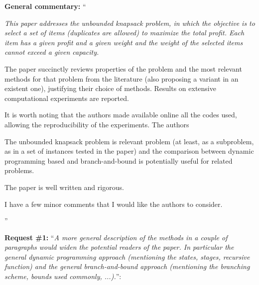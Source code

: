 \documentclass{elsarticle}
\begin{document}
\textbf{General commentary:} ``{\itshape
This paper addresses the unbounded knapsack problem, in which the objective is to select a set of items (duplicates are allowed) to maximize the total profit. Each item has a given profit and a given weight and the weight of the selected items cannot exceed a given capacity.

The paper succinctly reviews properties of the problem and the most relevant methods for that problem from the literature (also proposing a variant in an existent one), justifying their choice of methods. Results on extensive computational experiments are reported.

It is worth noting that the authors made available online all the codes used, allowing the reproducibility of the experiments. The authors

The unbounded knapsack problem is relevant problem (at least, as a subproblem, as in a set of instances tested in the paper) and the comparison between dynamic programming based and branch-and-bound is potentially useful for related problems.

The paper is well written and rigorous.

I have a few minor comments that I would like the authors to consider.
}''

\textbf{Request \#1:} ``\textit{A more general description of the methods in a couple of paragraphs would widen the potential readers of the paper. In particular the general dynamic programming approach (mentioning the states, stages, recursive function) and the general branch-and-bound approach (mentioning the branching scheme, bounds used commonly, ...).}'':
\end{document}
